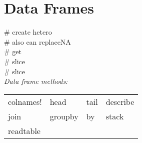 \section{Data Frames}

 \# create hetero \\
 \# also can replaceNA\\
 \# get \\
 \# slice \\
 \# slice \\

\textit{Data frame methods:}\\
{\scriptsize
\begin{tabular}{l l l l}
    colnames! & head & tail & describe \\
    join & groupby & by & stack \\
    readtable \\
\end{tabular}} \ \\




